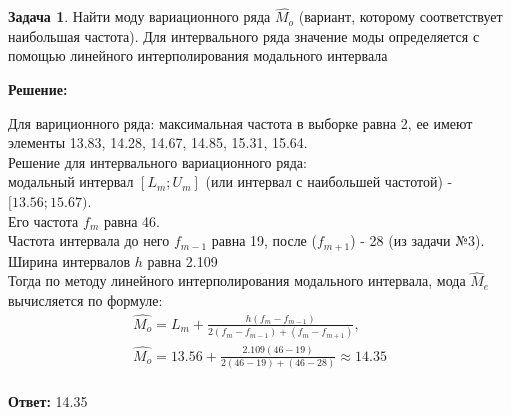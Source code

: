 \documentclass[a4paper,11pt]{article}
\theoremstyle{definition}
\newtheorem{problem}{Задача}\setlength{\parindent}{0pt}
\newenvironment{solution}
{\begin{shaded}\textbf{Решение:}\par\setlength{\parindent}{0pt}}
{\end{shaded}}
\newenvironment{answer}
{\par\noindent\textbf{Ответ:} }
{\par}
\begin{document}
\vspace{8pt}
\begin{problem}
    Найти моду вариационного ряда \(\hat{M_o}\) (вариант, которому соответствует
    наибольшая частота). Для интервального ряда значение моды определяется с
    помощью линейного интерполирования модального интервала
    
        \begin{solution}
            Для вариционного ряда: максимальная частота в выборке равна 2, ее имеют элементы
            13.83, 14.28, 14.67, 14.85, 15.31, 15.64.  \\

            Решение для интервального вариационного ряда: \\
            модальный интервал \([L_m; U_m]\) (или интервал с наибольшей частотой) - \( [13.56; 15.67) \). \\
            Его частота \(f_m\) равна 46. \\
            Частота интервала до него \(f_{m-1}\) равна 19, после (\(f_{m+1}\)) - 28 (из задачи №3).\\
            Ширина интервалов \(h\) равна 2.109 \\
            Тогда по методу линейного интерполирования модального интервала, мода \(\hat M_e\) вычисляется по формуле:
            \begin{gather*}
                \hat{M_o} = L_m + \frac{h(f_m - f_{m-1})}{2(f_m - f_{m-1}) + (f_m - f_{m+1})},\\
                \hat{M_o} = 13.56 + \frac{2.109(46 - 19)}{2(46 - 19) + (46 - 28)} \approx 14.35\\
            \end{gather*}
        \end{solution}
    
        \begin{answer}
            14.35
        \end{answer}
    
    \end{problem}
\end{document}
